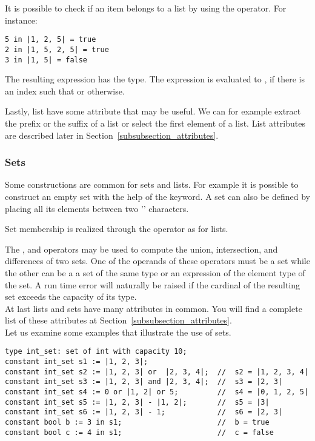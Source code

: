 It is possible to check if an item belongs to a list by using the
 operator.  For instance:
\begin{lstlisting}
5 in |1, 2, 5| = true
2 in |1, 5, 2, 5| = true
3 in |1, 5| = false
\end{lstlisting}
The resulting expression has the  type.  The
expression  is evaluated to , if
there is an index  such that  or
 otherwise.

 Lastly, list have some
attribute that may be useful.  We can for example extract the prefix
or the suffix of a list or select the first element of a list.  List
attributes are described later in
Section~\ref{subsubsection_attributes}.\\

\listdef


\subsubsection{Sets}
Some constructions are common for sets and lists.  For example it is
possible to construct an empty set with the help of the 
keyword.  A set can also be defined by placing all its elements
between two '\LS{|}' characters.

 Set membership is
realized through the  operator as for lists.

The ,  and \LS{-} operators may be used to compute the
union, intersection, and differences of two sets.  One of the operands
of these operators must be a set while the other can be a a set of the
same type or an expression of the element type of the set.  A run time
error will naturally be raised if the cardinal of the resulting set
exceeds the capacity of its type.\\

At last lists and sets have many attributes in common.  You will find
a complete list of these attributes at
Section~\ref{subsubsection_attributes}.\\

Let us examine some examples that illustrate the use of sets.
\begin{lstlisting}
type int_set: set of int with capacity 10;
constant int_set s1 := |1, 2, 3|;
constant int_set s2 := |1, 2, 3| or  |2, 3, 4|;  //  s2 = |1, 2, 3, 4|
constant int_set s3 := |1, 2, 3| and |2, 3, 4|;  //  s3 = |2, 3|
constant int_set s4 := 0 or |1, 2| or 5;         //  s4 = |0, 1, 2, 5|
constant int_set s5 := |1, 2, 3| - |1, 2|;       //  s5 = |3|
constant int_set s6 := |1, 2, 3| - 1;            //  s6 = |2, 3|
constant bool b := 3 in s1;                      //  b = true
constant bool c := 4 in s1;                      //  c = false
\end{lstlisting}

